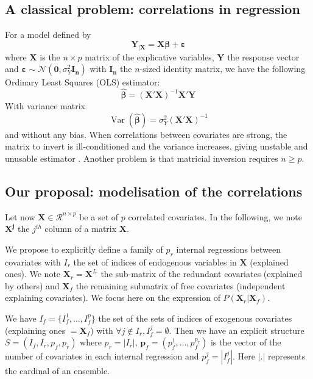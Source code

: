 \documentclass[11pt,a4paper]{article}
\begin{document}
\subsection{A classical problem: correlations in regression}\label{sectionOLS}
For a model defined by 
	\begin{equation}
		\boldsymbol{Y}_{|\boldsymbol{X}}=\boldsymbol{X\beta} + \boldsymbol{\varepsilon}
	\end{equation}
	where $\boldsymbol{X}$ is the $n\times p$ matrix of the explicative variables, $\boldsymbol{Y}$ the response vector and $\boldsymbol{\varepsilon} \sim \mathcal{N}(\boldsymbol{0},\sigma_Y^2\boldsymbol{I_n})$ with $\boldsymbol{I_n}$ the $n$-sized identity matrix,
	we have the following Ordinary Least Squares (\textsc{OLS}) estimator:
	\begin{equation}
		\boldsymbol{\hat{\beta}}=\left(\boldsymbol{X}'\boldsymbol{X} \right) ^{-1}\boldsymbol{X}'\boldsymbol{Y}
	\end{equation}
	With variance matrix
	\begin{equation}
		\operatorname{Var}(\boldsymbol{\hat{\beta}})=\sigma_Y^2\left(\boldsymbol{X}'\boldsymbol{X} \right) ^{-1} \label{eqOLS}
	\end{equation}
	and without any bias.
	When correlations between covariates are strong, the matrix to invert is ill-conditioned and the variance increases, giving unstable and unusable estimator \cite{hoerl1970ridge}.
	Another problem is that matricial inversion requires $n\geq p$. 
\subsection{Our proposal: modelisation of the correlations}
Let now $\boldsymbol{X} \in \mathcal{R}^{n\times p}$ be a set of $p$ correlated covariates.
In the following, we note $\boldsymbol{X^j}$ the $j^{th}$ column of a matrix $\boldsymbol{X}$.

We propose to explicitly define a family of $p_r$ internal regressions between covariates with $I_r$ the set of indices of endogenous variables in $\boldsymbol{X}$ (explained ones). We note $\boldsymbol{X}_r=\boldsymbol{X}^{I_r}$ the sub-matrix of the redundant covariates (explained by others) and  $\boldsymbol{X}_f$ the remaining submatrix of free covariates (independent explaining covariates).
We focus here on the expression of $P(\boldsymbol{X}_r|\boldsymbol{X}_f)$.

We have $I_f=\{I_f^1,\dots,I_f^p \}$ the set of the sets of indices of exogenous covariates (explaining ones $=\boldsymbol{X}_f$) with $\forall j \notin I_r, I_f^j=\emptyset$. Then we have an explicit structure $S=(I_f,I_r,p_f,p_r)$ where $p_r=|I_r|$, $\boldsymbol{p}_f=(p_f^1,\dots,p_f^{p_r})$ is the vector of the number of covariates in each internal regression  and $p_f^j=|I_f^j|$. Here $|.|$ represents the cardinal of an ensemble.
\end{document}
